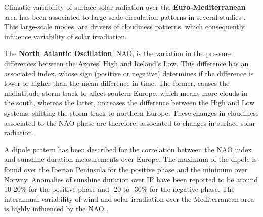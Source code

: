 
Climatic variability of surface solar radiation over the \textbf{Euro-Mediterranean} area has been associated to large-scale circulation patterns in several studies \cite*{Jerez2013a, Chiacchio2010, Sanchez-Lorenzo2009, Pozo-Vazquez2004}. This large-scale modes, are drivers of cloudiness patterns, which consequently influence variability of solar irradiation.

The \textbf{North Atlantic Oscillation}, NAO, is the variation in the pressure differences between the Azores' High and Iceland's Low. This difference has an associated index, whose sign (positive or negative) determines if the difference is lower or higher than the mean difference in time. The former, causes the midlatitude storm track to affect soutern Europe, which means more clouds in the south, whereas the latter, increases the difference between the High and Low systems, shifting the storm track to northern Europe. These changes in cloudiness associated to the NAO phase are therefore, associated to changes in surface solar radiation.


A dipole pattern has been described for the correlation between the NAO index and sunshine duration measurements \cite*{Pozo-Vazquez2004} over Europe. The maximum of the dipole is found over the Iberian Peninsula for the positive phase and the minimum over Norway. Anomalies of sunshine duration over IP have been reported to be around 10-20$\%$ for the positive phase and -20 to -30$\%$ for the negative phase. The interannual variability of wind and solar irradiation over the Mediterranean area is highly influenced by the NAO \cite*{pozo-Vazquez2011}.

